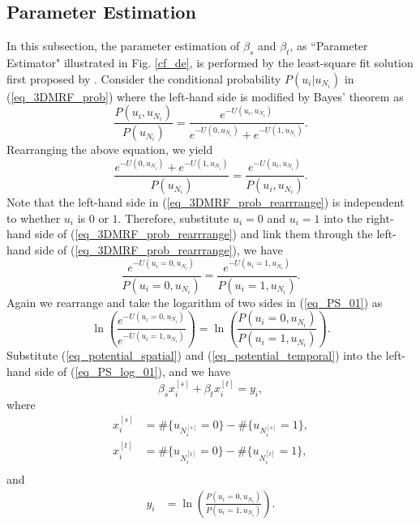 \documentclass[10pt,twocolumn,twoside]{IEEEtran}
\begin{document}
\subsection{Parameter Estimation}\label{subsec_par_est}
In this subsection, the parameter estimation of $\beta_s$ and $\beta_t$, as ``Parameter Estimator" illustrated in Fig. \ref{cf_de}, is performed by the least-square fit solution first proposed by \cite{Gibbs_par}. Consider the conditional probability $P(u_i|u_{N_i})$ in (\ref{eq_3DMRF_prob}) where the left-hand side is modified by Bayes' theorem as
\begin{equation}
\frac{P(u_i, u_{N_i})}{P(u_{N_i})} = \frac{e^{-U(u_i,u_{N_i})}}{e^{-U(0, u_{N_i})} + e^{-U(1, u_{N_i})}}.
\end{equation}
Rearranging the above equation, we yield
\begin{equation}
\frac{e^{-U(0, u_{N_i})} + e^{-U(1, u_{N_i})}}{P(u_{N_i})} = \frac{e^{-U(u_i,u_{N_i})}}{P(u_i, u_{N_i})}.
\label{eq_3DMRF_prob_rearrrange}
\end{equation}
Note that the left-hand side in (\ref{eq_3DMRF_prob_rearrrange}) is independent to whether $u_i$ is $0$ or $1$. Therefore, substitute $u_i=0$ and $u_i = 1$ into the right-hand side of (\ref{eq_3DMRF_prob_rearrrange}) and link them through the left-hand side of (\ref{eq_3DMRF_prob_rearrrange}), we have
\begin{equation}
\frac{e^{-U(u_i = 0,u_{N_i})}}{P(u_i = 0, u_{N_i})} = \frac{e^{-U(u_i = 1,u_{N_i})}}{P(u_i = 1, u_{N_i})}.
\label{eq_PS_01}
\end{equation}
Again we rearrange and take the logarithm of two sides in (\ref{eq_PS_01}) as
\begin{equation}
\ln(\frac{e^{-U(u_i = 0,u_{N_i})}}{e^{-U(u_i = 1,u_{N_i})}}) = \ln(\frac{P(u_i = 0, u_{N_i})}{P(u_i = 1, u_{N_i})}).
\label{eq_PS_log_01}
\end{equation}
Substitute (\ref{eq_potential_spatial}) and (\ref{eq_potential_temporal}) into the left-hand side of (\ref{eq_PS_log_01}), and we have
\begin{equation}
\beta_s x_i^{[s]} + \beta_t x_i^{[t]} = y_i,
\label{eq_PS_Linear}
\end{equation}
where
\begin{align}
x_i^{[s]} &= \#\{u_{N_i^{[s]}} = 0\} - \#\{u_{N_i^{[s]}} = 1\},\\
x_i^{[t]} &= \#\{u_{N_i^{[t]}} = 0\} - \#\{u_{N_i^{[t]}} = 1\}, \\
\end{align}
and
\begin{align}
y_i &=  \ln(\frac{P(u_i = 0, u_{N_i})}{P(u_i = 1, u_{N_i})}).
\end{align}
\end{document}
